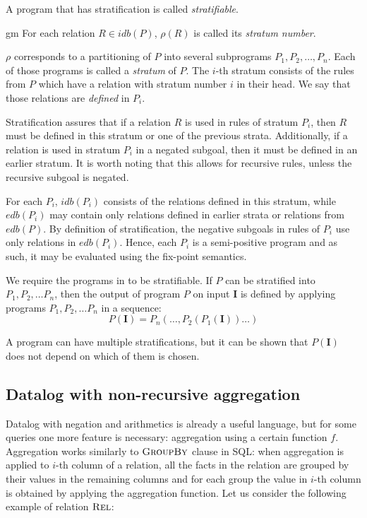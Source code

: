 \begin{defn}
A program that has stratification is called \emph{stratifiable}.
\end{defn}
gm
For each relation $R \in idb(P )$, $\rho(R)$ is called its \emph{stratum number}.

$\rho$ corresponds to a partitioning of $P$ into several subprograms $P_1, P_2, \dots, P_n$. Each of those programs is called a \emph{stratum} of $P$. The $i$-th stratum consists of the rules from $P$ which have a relation with stratum number $i$ in their head. We say that those relations are \emph{defined} in $P_i$.

Stratification assures that if a relation $R$ is used in rules of stratum $P_i$, then $R$ must be defined in this stratum or one of the previous strata. Additionally, if a relation is used in stratum $P_i$ in a negated subgoal, then it must be defined in an earlier stratum. It is worth noting that this allows for recursive rules, unless the recursive subgoal is negated.

For each $P_i$, $idb(P_i)$ consists of the relations defined in this stratum, while $edb(P_i)$ may contain only relations defined in earlier strata or relations from $edb(P)$. By definition of stratification, the negative subgoals in rules of $P_i$ use only relations in $edb(P_i)$. Hence, each $P_i$ is a semi-positive program and as such, it may be evaluated using the fix-point semantics.

We require the programs in \datalogneg to be stratifiable. If $P$ can be stratified into $P_1, P_2, \dots P_n$, then the output of program $P$ on input $\textbf{I}$ is defined by applying programs $P_1, P_2, \dots P_n$ in a sequence:
$$P(\textbf{I}) = P_n(\dots, P_2(P_1(\textbf{I}))\dots)$$

A program can have multiple stratifications, but it can be shown that $P(\textbf{I})$ does not depend on which of them is chosen.


\subsection{Datalog with non-recursive aggregation}\label{ss:datalognra}

Datalog with negation and arithmetics is already a useful language, but for some queries one more feature is necessary: aggregation using a certain function $f$. Aggregation works similarly to $\textsc{GroupBy}$ clause in SQL: when aggregation is applied to $i$-th column of a relation, all the facts in the relation are grouped by their values in the remaining columns and for each group the value in $i$-th column is obtained by applying the aggregation function.
Let us consider the following example of relation $\textsc{Rel}$:

